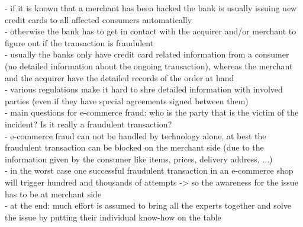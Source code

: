 - if it is known that a merchant has been hacked the bank is usually issuing new credit cards to all affected consumers automatically \\
- otherwise the bank has to get in contact with the acquirer and/or merchant to figure out if the transaction is fraudulent \\
- usually the banks only have credit card related information from a consumer (no detailed information about the ongoing transaction), whereas the merchant and the acquirer have the detailed records of the order at hand \\
- various regulations make it hard to shre detailed information with involved parties (even if they have special agreements signed between them) \\
- main questions for e-commerce fraud: who is the party that is the victim of the incident? Is it really a fraudulent transaction? \\
- e-commerce fraud can not be handled by technology alone, at best the fraudulent transaction can be blocked on the merchant side (due to the information given by the consumer like items, prices, delivery address, ...) \\
- in the worst case one successful fraudulent transaction in an e-commerce shop will trigger hundred and thousands of attempts -> so the awareness for the issue has to be at merchant side \\
- at the end: much effort is assumed to bring all the experts together and solve the issue by putting their individual know-how on the table \\


